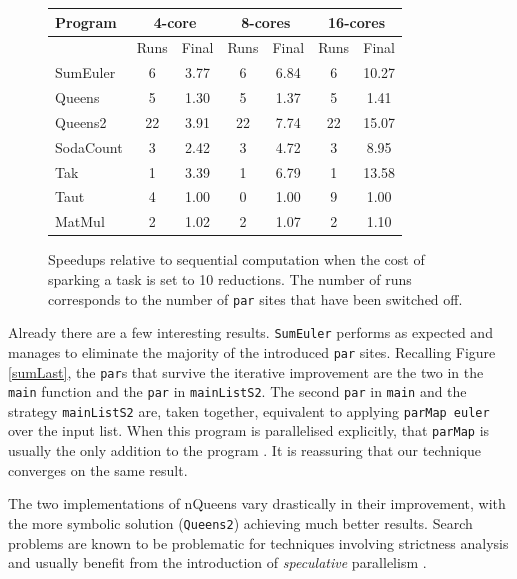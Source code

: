 \begin{figure}[ht]
\centering
  \begin{tabular}{ |l||c c|c c|c c| }
    \hline
    Program & \multicolumn{2}{c|}{4-core} & \multicolumn{2}{c|}{8-cores} & \multicolumn{2}{c|}{16-cores} \\
    \hline
            & Runs & Final     & Runs & Final      & Runs & Final \\
    \hline
    SumEuler  & 6    & 3.77      & 6    & 6.84       & 6    & 10.27     \\
    Queens    & 5    & 1.30      & 5    & 1.37       & 5    & 1.41  \\
    Queens2   & 22   & 3.91      & 22   & 7.74       & 22   & 15.07   \\
    SodaCount & 3    & 2.42      & 3    & 4.72       & 3    & 8.95    \\
    Tak       & 1    & 3.39      & 1    & 6.79       & 1    & 13.58   \\
    Taut      & 4    & 1.00      & 0    & 1.00       & 9    & 1.00  \\
    MatMul    & 2    & 1.02      & 2    & 1.07       & 2    & 1.10   \\
    \hline
  \end{tabular}
\caption{Speedups relative to sequential computation when the cost of sparking
        a task is set to 10 reductions. The number of runs corresponds to the
        number of \texttt{par} sites that have been switched off.}
\label{table10}
\end{figure}

Already there are a few interesting results. \texttt{SumEuler} performs as expected and
manages to eliminate the majority of the introduced \verb-par- sites. Recalling
Figure \ref{sumLast}, the \verb-par-s that survive the iterative improvement
are the two in the \verb-main- function and the \verb-par- in \verb-mainListS2-.
The second \verb-par- in \verb-main- and the strategy \verb-mainListS2- are,
taken together, equivalent to applying \verb-parMap euler- over the input list.
When this program is parallelised explicitly, that \verb-parMap- is usually the
only addition to the program \citep{vGMachine}. It is reassuring that our
technique converges on the same result.

The two implementations of nQueens vary drastically in their improvement, with
the more symbolic solution (\texttt{Queens2}) achieving much better results. Search
problems are known to be problematic for techniques involving strictness
analysis and usually benefit from the introduction of \emph{speculative}
parallelism \citep{hammond2000research}.

